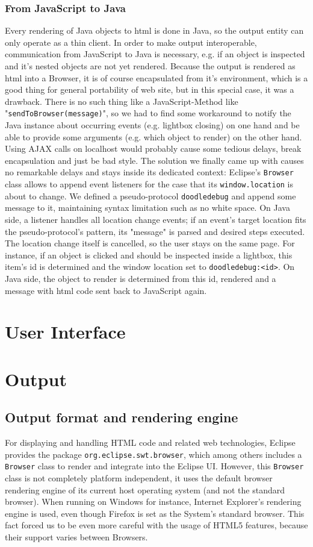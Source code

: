 \documentclass{acm_proc_article-sp}
\begin{document}
\subsubsection{From JavaScript to Java}
Every rendering of Java objects to html is done in Java, so the output entity can only operate as a thin client.
In order to make output interoperable, communication from JavaScript to Java is necessary, e.g. if an object is inspected and it's nested objects are not yet rendered. Because the output is rendered as html into a Browser, it is of course encapsulated from it's environment, which is a good thing for general portability of web site, but in this special case, it was a drawback. There is no such thing like a JavaScript-Method like "\verb.sendToBrowser(message).", so we had to find some workaround to notify the Java instance about occurring events (e.g. lightbox closing) on one hand and be able to provide some arguments (e.g. which object to render) on the other hand. Using AJAX calls on localhost would probably cause some tedious delays, break encapsulation and just be bad style. The solution we finally came up with causes no remarkable delays and stays inside its dedicated context: Eclipse's \verb.Browser. class allows to append event listeners for the case that its \verb-window.location- is about to change. We defined a pseudo-protocol \verb-doodledebug- and append some message to it, maintaining syntax limitation such as no white space. On Java side, a listener handles all location change events; if an event's target location fits the pseudo-protocol's pattern, its "message" is parsed and desired steps executed. The location change itself is cancelled, so the user stays on the same page. For instance, if an object is clicked and should be inspected inside a lightbox, this item's id is determined and the window location set to \verb-doodledebug:<id>-. On Java side, the object to render is determined from this id, rendered and a message with html code sent back to JavaScript again.

\section{User Interface}
\section{Output}
\subsection{Output format and rendering engine}
For displaying and handling HTML code and related web technologies, Eclipse provides the package \verb-org.eclipse.swt.browser-, which among others includes a \verb.Browser. class to render and integrate into the Eclipse UI. However, this \verb.Browser. class is not completely platform independent, it uses the default browser rendering engine of its current host operating system (and not the standard browser). When running on Windows for instance, Internet Explorer's rendering engine is used, even though Firefox is set as the System's standard browser. This fact forced us to be even more careful with the usage of HTML5 features, because their support varies between Browsers.
\end{document}
